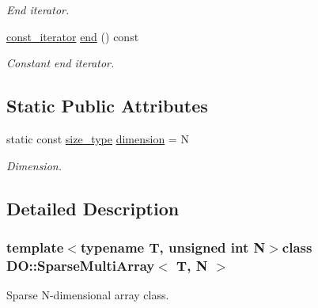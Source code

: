 \begin{DoxyCompactItemize}
\begin{DoxyCompactList}\small\item\em End iterator. \end{DoxyCompactList}\item 
\hypertarget{class_d_o_1_1_sparse_multi_array_a350132543d80a1c1e5be844e6d2878ea}{\hyperlink{class_d_o_1_1_sparse_multi_array_a136285f5e1620856973c0c4007453a57}{const\-\_\-iterator} \hyperlink{class_d_o_1_1_sparse_multi_array_a350132543d80a1c1e5be844e6d2878ea}{end} () const }\label{class_d_o_1_1_sparse_multi_array_a350132543d80a1c1e5be844e6d2878ea}

\begin{DoxyCompactList}\small\item\em Constant end iterator. \end{DoxyCompactList}\end{DoxyCompactItemize}
\subsection*{Static Public Attributes}
\begin{DoxyCompactItemize}
\item 
\hypertarget{class_d_o_1_1_sparse_multi_array_a707c3ebff4b3587b5e3a4f8000ecb024}{static const \hyperlink{class_d_o_1_1_sparse_multi_array_ada51e68d31936547d3729c82daf6b7c6}{size\-\_\-type} \hyperlink{class_d_o_1_1_sparse_multi_array_a707c3ebff4b3587b5e3a4f8000ecb024}{dimension} = N}\label{class_d_o_1_1_sparse_multi_array_a707c3ebff4b3587b5e3a4f8000ecb024}

\begin{DoxyCompactList}\small\item\em Dimension. \end{DoxyCompactList}\end{DoxyCompactItemize}


\subsection{Detailed Description}
\subsubsection*{template$<$typename T, unsigned int N$>$class D\-O\-::\-Sparse\-Multi\-Array$<$ T, N $>$}

Sparse N-\/dimensional array class. 

